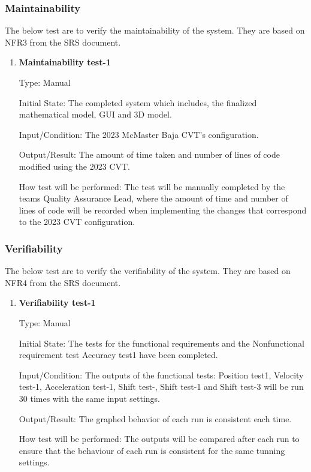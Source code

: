 \documentclass[12pt, titlepage]{article}
\begin{document}
\subsubsection{Maintainability}

The below test are to verify the maintainability of the system.
They are based on NFR3 from the SRS document.

\begin{enumerate}

  \item {} \hypertarget{Maintainability test-1}{\textbf{Maintainability test-1}} \label{Maintainability test-1}

Type: Manual
					
Initial State: The completed system which includes, the finalized mathematical model, GUI and 3D model.  
					
Input/Condition: The 2023 McMaster Baja CVT's configuration. 
					
Output/Result: The amount of time taken and number of lines of code modified using the 2023 CVT.
					
How test will be performed: The test will be manually completed by the teams Quality Assurance Lead, where the amount of time and number of lines of code will be recorded when implementing the changes that correspond to the 2023 CVT configuration.

\end{enumerate}

\subsubsection{Verifiability}

The below test are to verify the verifiability of the system.
They are based on NFR4 from the SRS document.

\begin{enumerate}

  \item {} \hypertarget{Verifiability test-1}{\textbf{Verifiability test-1}} \label{Verifiability test-1}

Type: Manual
					
Initial State: The tests for the functional requirements and the Nonfunctional requirement test Accuracy test1 have been completed.
					
Input/Condition: The outputs of the functional tests: Position test1, Velocity test-1, Acceleration test-1, Shift test-, Shift test-1 and Shift test-3 will be run 30 times with the same input settings. 
					
Output/Result: The graphed behavior of each run is consistent each time.
					
How test will be performed: The outputs will be compared after each run to ensure that the behaviour of each run is consistent for the same tunning settings.

\end{enumerate}
\end{document}
